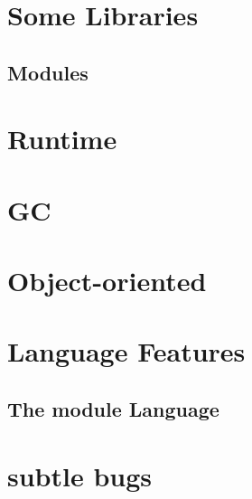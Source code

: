 \documentclass[svgnames,12pt,a4paper]{report}
\begin{document}
\chapter{Some Libraries}


















\section{Modules}


\chapter{Runtime}
\label{sec:runtime}


\chapter{GC}
\label{sec:gc}



\chapter{Object-oriented}



\chapter{Language Features}
\label{sec:compl-lang-feat}










\section{The module Language}
\label{sec:module-language}

\chapter{subtle bugs}
\label{sec:subtle-bugs}

\end{document}
